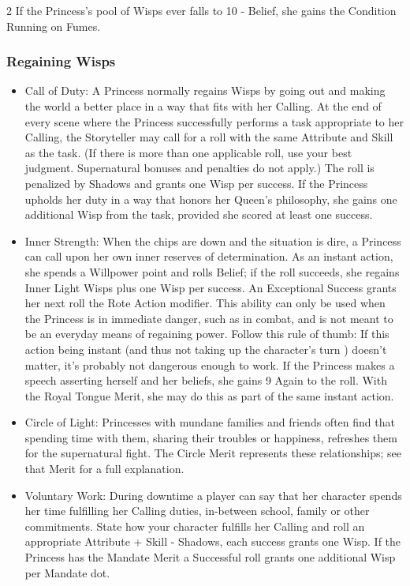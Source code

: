 \begin{multicols}{2}
\noindent If the Princess's pool of Wisps ever falls to 10 - Belief, she gains the Condition Running on Fumes.

\subsubsection*{Regaining Wisps}
\begin{itemize}
\item    Call of Duty: A Princess normally regains Wisps by going out and making the world a better place in a way that fits with her Calling. At the end of every scene where the Princess successfully performs a task appropriate to her Calling, the Storyteller may call for a roll with the same Attribute and Skill as the task. (If there is more than one applicable roll, use your best judgment. Supernatural bonuses and penalties do not apply.) The roll is penalized by Shadows and grants one Wisp per success. If the Princess upholds her duty in a way that honors her Queen’s philosophy, she gains one additional Wisp from the task, provided she scored at least one success.
\item    Inner Strength: When the chips are down and the situation is dire, a Princess can call upon her own inner reserves of determination. As an instant action, she spends a Willpower point and rolls Belief; if the roll succeeds, she regains Inner Light Wisps plus one Wisp per success. An Exceptional Success grants her next roll the Rote Action modifier. This ability can only be used when the Princess is in immediate danger, such as in combat, and is not meant to be an everyday means of regaining power. Follow this rule of thumb: If this action being instant (and thus not taking up the character's turn ) doesn't matter, it's probably not dangerous enough to work. If the Princess makes a speech asserting herself and her beliefs, she gains 9 Again to the roll. With the Royal Tongue Merit, she may do this as part of the same instant action. 
\item    Circle of Light: Princesses with mundane families and friends often find that spending time with them, sharing their troubles or happiness, refreshes them for the supernatural fight. The Circle Merit represents these relationships; see that Merit for a full explanation. 
\item Voluntary Work: During downtime a player can say that her character spends her time fulfilling her Calling duties, in-between school, family or other commitments. State how your character fulfills her Calling and roll an appropriate Attribute + Skill - Shadows, each success grants one Wisp. If the Princess has the Mandate Merit a Successful roll grants one additional Wisp per Mandate dot.
\end{itemize}


\end{multicols}
